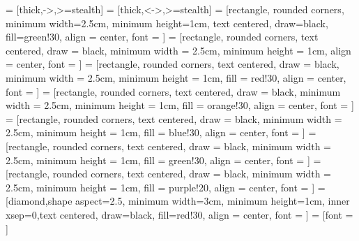 \usepackage{cases}
\usepackage{hyperref}
\usepackage{color, soul}
\usepackage[utf8]{inputenc}
\usepackage{subfig}
\usepackage{rotating}
\usepackage[usenames,dvipsnames]{xcolor}
\usepackage{tikz}
\usetikzlibrary{decorations.pathreplacing, calligraphy}
\usetikzlibrary{quotes,angles}
\usetikzlibrary{shapes.geometric,arrows}
\usetikzlibrary{fit}
\usetikzlibrary{backgrounds}

     = [thick,->,>=stealth]
  = [thick,<->,>=stealth]
 = [rectangle, rounded corners, minimum width=2.5cm, minimum height=1cm, text centered, draw=black, fill=green!30, align = center, font = \fontsize{10}{10}\selectfont]
 = [rectangle, rounded corners, text centered, draw = black, minimum width = 2.5cm, minimum height = 1cm, align = center, font = \fontsize{10}{10}\selectfont]
 = [rectangle, rounded corners, text centered, draw = black, minimum width = 2.5cm, minimum height = 1cm, fill = red!30, align = center, font = \fontsize{10}{10}\selectfont]
 = [rectangle, rounded corners, text centered, draw = black, minimum width = 2.5cm, minimum height = 1cm, fill = orange!30, align = center, font = \fontsize{10}{10}\selectfont]
 = [rectangle, rounded corners, text centered, draw = black, minimum width = 2.5cm, minimum height = 1cm, fill = blue!30, align = center, font = \fontsize{10}{10}\selectfont]
 = [rectangle, rounded corners, text centered, draw = black, minimum width = 2.5cm, minimum height = 1cm, fill = green!30, align = center, font = \fontsize{10}{10}\selectfont]
 = [rectangle, rounded corners, text centered, draw = black, minimum width = 2.5cm, minimum height = 1cm, fill = purple!20, align = center, font = \fontsize{10}{10}\selectfont]
  = [diamond,shape aspect=2.5, minimum width=3cm, minimum height=1cm, inner xsep=0,text centered, draw=black, fill=red!30, align = center, font = \fontsize{10}{10}\selectfont]
 = [font = \fontsize{10}{10}\selectfont]


\usepackage{pgfplots}
\pgfplotsset{compat=1.16}
\usepackage{ifthen}
\usepackage{longtable}
\usepackage{siunitx}
\usepackage{listings}
\usepackage{multirow}
\usepackage{pifont}
\usepackage{gensymb}
\usepackage{bm}

